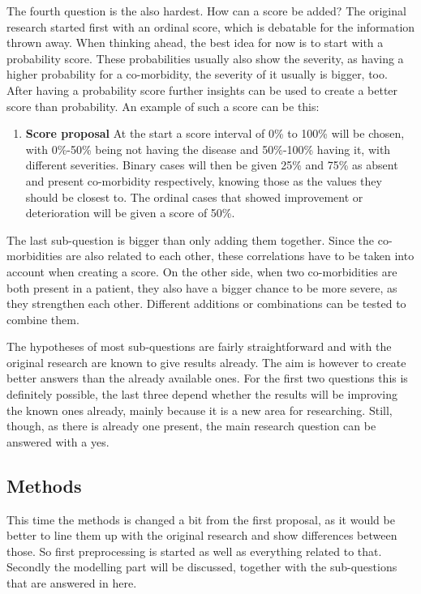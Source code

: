 \documentclass[10pt,a4paper]{report}
\begin{document}
	The fourth question is the also hardest. How can a score be added? The original research started first with an ordinal score, which is debatable for the information thrown away. When thinking ahead, the best idea for now is to start with a probability score. These probabilities usually also show the severity, as having a higher probability for a co-morbidity, the severity of it usually is bigger, too. After having a probability score further insights can be used to create a better score than probability. An example of such a score can be this:
	
	\begin{enumerate}
		\item[] \textbf{Score proposal} At the start a score interval of 0\% to 100\% will be chosen, with 0\%-50\% being not having the disease and 50\%-100\% having it, with different severities. Binary cases will then be given 25\% and 75\% as absent and present co-morbidity respectively, knowing those as the values they should be closest to. The ordinal cases that showed improvement or deterioration will be given a score of 50\%. 
	\end{enumerate}
	
	The last sub-question is bigger than only adding them together. Since the co-morbidities are also related to each other, these correlations have to be taken into account when creating a score. On the other side, when two co-morbidities are both present in a patient, they also have a bigger chance to be more severe, as they strengthen each other. Different additions or combinations can be tested to combine them.
	
	The hypotheses of most sub-questions are fairly straightforward and with the original research are known to give results already. The aim is however to create better answers than the already available ones. For the first two questions this is definitely possible, the last three depend whether the results will be improving the known ones already, mainly because it is a new area for researching. Still, though, as there is already one present, the main research question can be answered with a yes.
	
	\subsection{Methods}
	\label{subsec:FinalMethods}
	
	This time the methods is changed a bit from the first proposal, as it would be better to line them up with the original research and show differences between those. So first preprocessing is started as well as everything related to that. Secondly the modelling part will be discussed, together with the sub-questions that are answered in here.
	
\end{document}
